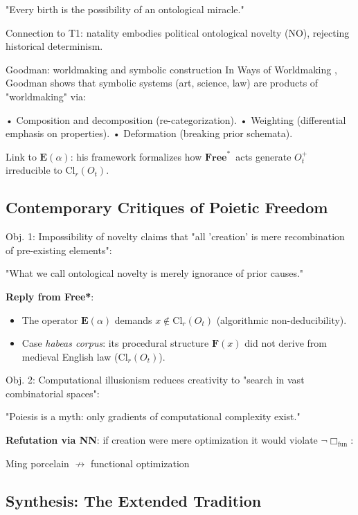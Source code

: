 \documentclass[11pt,a4paper]{article}
\newcommand{\Free}{\ensuremath{\mathbf{Free}^{\ast}}}
\begin{document}
"Every birth is the possibility of an ontological miracle." \cite[p. 178]{arendt1958}

Connection to T1: natality embodies political ontological novelty (NO), rejecting historical determinism.

Goodman: worldmaking and symbolic construction In Ways of Worldmaking \cite{goodman1978}, Goodman shows that symbolic systems (art, science, law) are products of "worldmaking" via:

• Composition and decomposition (re-categorization).
• Weighting (differential emphasis on properties).
• Deformation (breaking prior schemata).

Link to \(\mathbf{E}(\alpha)\): his framework formalizes how \Free\ acts generate \(O_{t}^{+}\) irreducible to \(\mathrm{Cl}_{r}(O_{t})\).

\subsection{Contemporary Critiques of Poietic Freedom}\label{sec:soa-critiques}

Obj. 1: Impossibility of novelty \cite{strawson2023} claims that "all 'creation' is mere recombination of pre-existing elements":

"What we call ontological novelty is merely ignorance of prior causes." \cite[p. 117]{strawson2023}

\textbf{Reply from Free*}:
\begin{itemize}
  \item The operator \(\mathbf{E}(\alpha)\) demands \(x\notin\mathrm{Cl}_{r}(O_{t})\) (algorithmic non-deducibility).
  \item Case \emph{habeas corpus}: its procedural structure \(\mathbf{F}(x)\) did not derive from medieval English law (\(\mathrm{Cl}_{r}(O_{t})\)).
\end{itemize}

Obj. 2: Computational illusionism \cite{greene2021} reduces creativity to "search in vast combinatorial spaces":

"Poiesis is a myth: only gradients of computational complexity exist." \cite[p. 215]{greene2021}

\textbf{Refutation via NN}: if creation were mere optimization it would violate \(\neg\Box_{\text{fun}}\):

Ming porcelain \(\not\to\) functional optimization \cite{kerr2024}

\subsection{Synthesis: The Extended Tradition}\label{sec:soa-synthesis}
\end{document}
